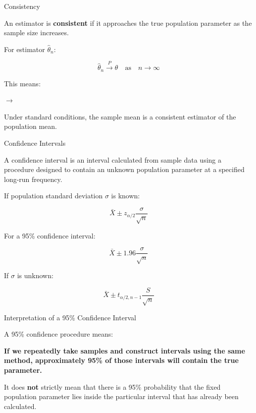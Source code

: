 \documentclass[aspectratio=169]{beamer}
\begin{document}
\begin{frame}{Consistency}

An estimator is \textbf{consistent} if it approaches the true
population parameter as the sample size increases.

For estimator $\hat{\theta}_n$:

\[
\boxed{
\hat{\theta}_n
\xrightarrow{P}
\theta
\quad\text{as}\quad n\rightarrow\infty
}
\]

This means:

\begin{center}
$\rightarrow$
\end{center}

Under standard conditions, the sample mean is a consistent
estimator of the population mean.
\end{frame}

\begin{frame}{Confidence Intervals}

A confidence interval is an interval calculated from sample data
using a procedure designed to contain an unknown population
parameter at a specified long-run frequency.

If population standard deviation $\sigma$ is known:

\[
\boxed{
\bar X
\pm
z_{\alpha/2}
\frac{\sigma}{\sqrt n}
}
\]

For a 95\% confidence interval:

\[
\boxed{
\bar X
\pm
1.96\frac{\sigma}{\sqrt n}
}
\]

If $\sigma$ is unknown:

\[
\boxed{
\bar X
\pm
t_{\alpha/2,n-1}
\frac{S}{\sqrt n}
}
\]
\end{frame}

\begin{frame}{Interpretation of a 95\% Confidence Interval}

A 95\% confidence procedure means:

\begin{center}
\textbf{If we repeatedly take samples and construct intervals
using the same method, approximately 95\% of those intervals
will contain the true parameter.}
\end{center}

\vspace{0.5cm}

It does \textbf{not} strictly mean that there is a 95\% probability
that the fixed population parameter lies inside the particular
interval that has already been calculated.
\end{frame}
\end{document}
